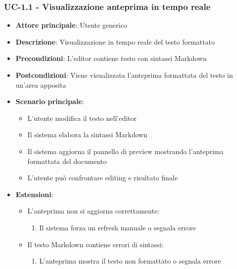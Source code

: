 \documentclass[11pt,a4paper]{article}
\begin{document}
\subsubsection{UC-1.1 - Visualizzazione anteprima in tempo reale}
\begin{itemize}
    \item \textbf{Attore principale}: Utente generico
    \item \textbf{Descrizione}: Visualizzazione in tempo reale del testo formattato
    \item \textbf{Precondizioni}: L'editor contiene testo con sintassi Markdown
    \item \textbf{Postcondizioni}: Viene visualizzata l'anteprima formattata del testo in un'area apposita
    \item \textbf{Scenario principale}:
        \begin{itemize}
            \item L'utente modifica il testo nell'editor
            \item Il sistema elabora la sintassi Markdown
            \item Il sistema aggiorna il pannello di preview mostrando l’anteprima formattata del documento
            \item L'utente può confrontare editing e risultato finale
        \end{itemize}
    \item \textbf{Estensioni}:
        \begin{itemize}
            \item L'anteprima non si aggiorna correttamente:
                \begin{enumerate}
                    \item Il sistema forza un refresh manuale o segnala errore
                \end{enumerate}
            \item Il testo Markdown contiene errori di sintassi:
                \begin{enumerate}
                    \item L'anteprima mostra il testo non formattato o segnala errore
                \end{enumerate}
        \end{itemize}
\end{itemize}
\end{document}
